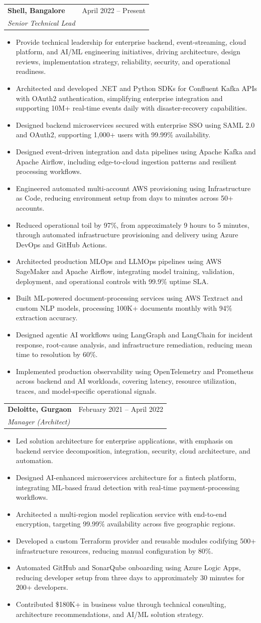 \documentclass[letterpaper,10.5pt]{article}
\makeatletter
\newcommand{\resumeItem}[1]{
  \item\small{#1 \vspace{-2pt}}
}
\newcommand{\resumeSubheading}[4]{
  \vspace{-2pt}\item
  \begin{tabular*}{0.97\textwidth}[t]{l@{\extracolsep{\fill}}r}
    \textbf{#1} & #2 \\
    \textit{\small#3} & \textit{\small #4} \\
  \end{tabular*}\vspace{-7pt}
}
\newcommand{\resumeItemListStart}{\begin{itemize}[leftmargin=0.18in]}
\newcommand{\resumeItemListEnd}{\end{itemize}\vspace{-5pt}}
\makeatother
\begin{document}
\resumeSubheading
  {Shell, Bangalore}{April 2022 -- Present}
  {Senior Technical Lead}{}
\resumeItemListStart
  \resumeItem{Provide technical leadership for enterprise backend, event-streaming, cloud platform, and AI/ML engineering initiatives, driving architecture, design reviews, implementation strategy, reliability, security, and operational readiness.}
  \resumeItem{Architected and developed .NET and Python SDKs for Confluent Kafka APIs with OAuth2 authentication, simplifying enterprise integration and supporting 10M+ real-time events daily with disaster-recovery capabilities.}
  \resumeItem{Designed backend microservices secured with enterprise SSO using SAML 2.0 and OAuth2, supporting 1,000+ users with 99.99\% availability.}
  \resumeItem{Designed event-driven integration and data pipelines using Apache Kafka and Apache Airflow, including edge-to-cloud ingestion patterns and resilient processing workflows.}
  \resumeItem{Engineered automated multi-account AWS provisioning using Infrastructure as Code, reducing environment setup from days to minutes across 50+ accounts.}
  \resumeItem{Reduced operational toil by 97\%, from approximately 9 hours to 5 minutes, through automated infrastructure provisioning and delivery using Azure DevOps and GitHub Actions.}
  \resumeItem{Architected production MLOps and LLMOps pipelines using AWS SageMaker and Apache Airflow, integrating model training, validation, deployment, and operational controls with 99.9\% uptime SLA.}
  \resumeItem{Built ML-powered document-processing services using AWS Textract and custom NLP models, processing 100K+ documents monthly with 94\% extraction accuracy.}
  \resumeItem{Designed agentic AI workflows using LangGraph and LangChain for incident response, root-cause analysis, and infrastructure remediation, reducing mean time to resolution by 60\%.}
  \resumeItem{Implemented production observability using OpenTelemetry and Prometheus across backend and AI workloads, covering latency, resource utilization, traces, and model-specific operational signals.}
\resumeItemListEnd

\resumeSubheading
  {Deloitte, Gurgaon}{February 2021 -- April 2022}
  {Manager (Architect)}{}
\resumeItemListStart
  \resumeItem{Led solution architecture for enterprise applications, with emphasis on backend service decomposition, integration, security, cloud architecture, and automation.}
  \resumeItem{Designed AI-enhanced microservices architecture for a fintech platform, integrating ML-based fraud detection with real-time payment-processing workflows.}
  \resumeItem{Architected a multi-region model replication service with end-to-end encryption, targeting 99.99\% availability across five geographic regions.}
  \resumeItem{Developed a custom Terraform provider and reusable modules codifying 500+ infrastructure resources, reducing manual configuration by 80\%.}
  \resumeItem{Automated GitHub and SonarQube onboarding using Azure Logic Apps, reducing developer setup from three days to approximately 30 minutes for 200+ developers.}
  \resumeItem{Contributed \$180K+ in business value through technical consulting, architecture recommendations, and AI/ML solution strategy.}
\resumeItemListEnd
\end{document}

